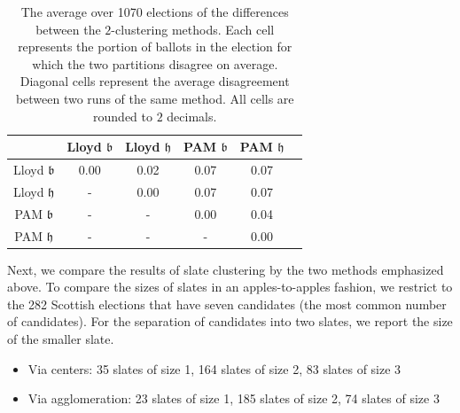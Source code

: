 \documentclass{amsart}
\newcommand{\dcand}{D_B}
\newcommand{\bb}{\mathfrak{b}}
\newcommand{\hh}{\mathfrak{h}}
\theoremstyle{plain}
\theoremstyle{definition}
\theoremstyle{remark}
\begin{document}
\begin{table}[bht!]
\begin{tabular}{cccccc}
\toprule & Lloyd $\bb$ & Lloyd $\hh$ & PAM $\bb$ & PAM $\hh$  \\
\midrule Lloyd $\bb$ &0.00 &0.02 &0.07 &0.07  \\
Lloyd $\hh$  & -& 0.00& 0.07&0.07  \\
PAM $\bb$ &- &-&0.00 &0.04  \\
PAM $\hh$ &- &- &- & 0.00 \\
\bottomrule
\end{tabular}
\caption{The average over 1070 elections of the differences between the $2$-clustering methods.  Each cell represents the portion of ballots in the election for which the two partitions disagree on average.  Diagonal cells represent the average disagreement between two runs of the same method. 
 All cells are rounded to $2$ decimals.}\label{T:methods}
\end{table}



Next, we compare the results of slate clustering by the two methods emphasized above.  To compare the sizes of slates in an apples-to-apples fashion, we restrict to the 282 Scottish elections that have seven candidates (the most common number of candidates).  For the separation of candidates into two slates, we report the size of the smaller slate. 
\begin{itemize}
\item Via centers: 35 slates of size 1, 164 slates of size 2, 83 slates of size 3
\item Via agglomeration: 23 slates of size 1, 185 slates of size 2, 74 slates of size 3
\end{itemize}
\end{document}
